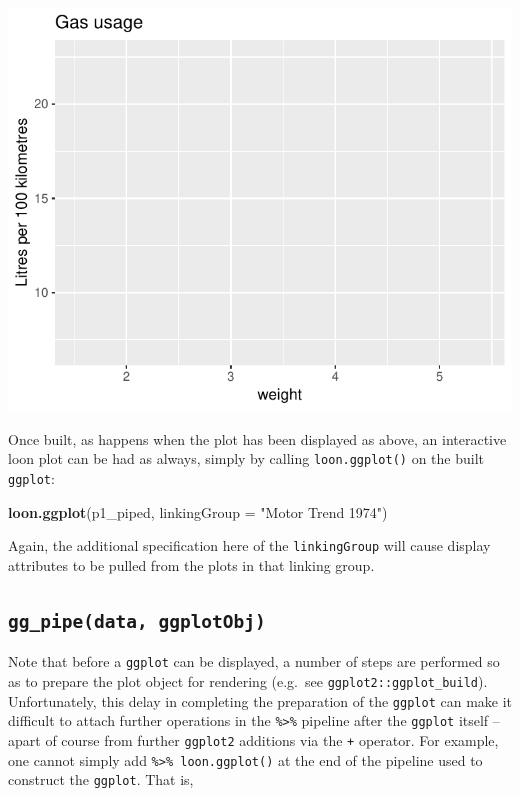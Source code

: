 \documentclass[]{article}
\newenvironment{Shaded}{\begin{snugshade}}{\end{snugshade}}
\newcommand{\KeywordTok}[1]{\textcolor[rgb]{0.13,0.29,0.53}{\textbf{#1}}}
\newcommand{\DataTypeTok}[1]{\textcolor[rgb]{0.13,0.29,0.53}{#1}}
\newcommand{\StringTok}[1]{\textcolor[rgb]{0.31,0.60,0.02}{#1}}
\newcommand{\NormalTok}[1]{#1}
\begin{document}
\begin{center}\includegraphics[width=0.7\linewidth]{ggplots2loon_files/figure-latex/p1_piped-1} \end{center}

Once built, as happens when the plot has been displayed as above, an
interactive loon plot can be had as always, simply by calling
\texttt{loon.ggplot()} on the built \texttt{ggplot}:

\begin{Shaded}
\begin{Highlighting}[]
\KeywordTok{loon.ggplot}\NormalTok{(p1_piped, }\DataTypeTok{linkingGroup =} \StringTok{"Motor Trend 1974"}\NormalTok{)}
\end{Highlighting}
\end{Shaded}

Again, the additional specification here of the \texttt{linkingGroup}
will cause display attributes to be pulled from the plots in that
linking group.

\subsection{\texorpdfstring{\texttt{gg\_pipe(data,\ ggplotObj)}}{gg\_pipe(data, ggplotObj)}}\label{gg_pipedata-ggplotobj}

Note that before a \texttt{ggplot} can be displayed, a number of steps
are performed so as to prepare the plot object for rendering (e.g.~see
\texttt{ggplot2::ggplot\_build}). Unfortunately, this delay in
completing the preparation of the \texttt{ggplot} can make it difficult
to attach further operations in the \texttt{\%\textgreater{}\%} pipeline
after the \texttt{ggplot} itself -- apart of course from further
\texttt{ggplot2} additions via the \texttt{+} operator. For example, one
cannot simply add \texttt{\%\textgreater{}\%\ loon.ggplot()} at the end
of the pipeline used to construct the \texttt{ggplot}. That is,
\end{document}
